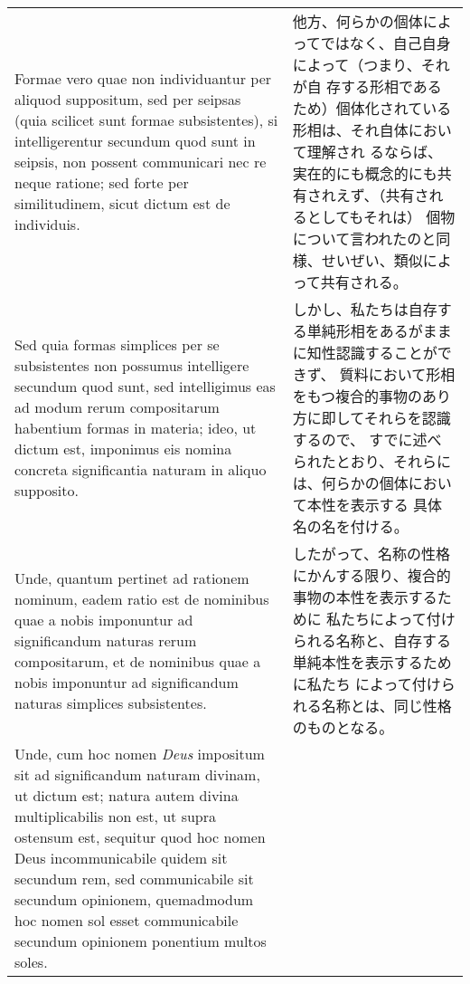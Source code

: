\documentclass[paper=a4paper,fontsize=10pt,jafontsize=9pt,titlepage]{jlreq}
\begin{document}
\begin{longtable}{p{21em}p{21em}}
\\

Formae vero quae non individuantur per aliquod suppositum, sed per
seipsas (quia scilicet sunt formae subsistentes), si intelligerentur
secundum quod sunt in seipsis, non possent communicari nec re neque
ratione; sed forte per similitudinem, sicut dictum est de individuis.

&

他方、何らかの個体によってではなく、自己自身によって（つまり、それが自
存する形相であるため）個体化されている形相は、それ自体において理解され
るならば、実在的にも概念的にも共有されえず、（共有されるとしてもそれは）
個物について言われたのと同様、せいぜい、類似によって共有される。

\\

Sed quia formas simplices per se subsistentes non possumus intelligere
secundum quod sunt, sed intelligimus eas ad modum rerum compositarum
habentium formas in materia; ideo, ut dictum est, imponimus eis nomina
concreta significantia naturam in aliquo supposito.

&

しかし、私たちは自存する単純形相をあるがままに知性認識することができず、
質料において形相をもつ複合的事物のあり方に即してそれらを認識するので、
すでに述べられたとおり、それらには、何らかの個体において本性を表示する
具体名の名を付ける。

\\

Unde, quantum pertinet ad rationem nominum, eadem ratio est de
nominibus quae a nobis imponuntur ad significandum naturas rerum
compositarum, et de nominibus quae a nobis imponuntur ad significandum
naturas simplices subsistentes.

&

したがって、名称の性格にかんする限り、複合的事物の本性を表示するために
私たちによって付けられる名称と、自存する単純本性を表示するために私たち
によって付けられる名称とは、同じ性格のものとなる。

\\

Unde, cum hoc nomen {\itshape Deus} impositum sit ad significandum
naturam divinam, ut dictum est; natura autem divina multiplicabilis
non est, ut supra ostensum est, sequitur quod hoc nomen Deus
incommunicabile quidem sit secundum rem, sed communicabile sit
secundum opinionem, quemadmodum hoc nomen sol esset communicabile
secundum opinionem ponentium multos soles.

&


\end{longtable}
\end{document}
